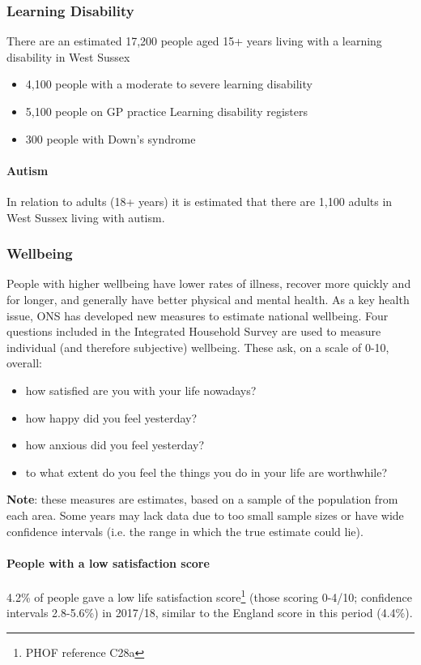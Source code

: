 \subsubsection{Learning Disability} There are an estimated 17,200 people aged 15+ years living with a learning disability in West Sussex

\begin{itemize}
    \item 4,100 people with a moderate to severe learning disability
    \item 5,100 people on GP practice Learning disability registers
    \item 300 people with Down's syndrome
\end{itemize}

\paragraph{Autism} In relation to adults (18+ years) it is estimated that there are 1,100 adults in West Sussex living with autism.

\subsubsection{Wellbeing}
People with higher wellbeing have lower rates of illness, recover more quickly and for longer, and generally have better physical and mental health. As a key health issue, ONS has developed new measures to estimate national wellbeing. Four questions included in the Integrated Household Survey are used to measure individual (and therefore subjective) wellbeing. These ask, on a scale of 0-10, overall:

\begin{itemize}[noitemsep]
    \item how satisfied are you with your life nowadays?
    \item how happy did you feel yesterday?
    \item how anxious did you feel yesterday?
    \item to what extent do you feel the things you do in your life are worthwhile?
\end{itemize}

{\bf Note}: these measures are estimates, based on a sample of the population from each area. Some years may lack data due to too small sample sizes or have wide confidence intervals (i.e. the range in which the true estimate could lie).

\paragraph{People with a low satisfaction score} 4.2\% of people gave a low life satisfaction score\footnote{PHOF reference C28a} (those scoring 0-4/10; confidence intervals 2.8-5.6\%) in 2017/18, similar to the England score in this period (4.4\%).

